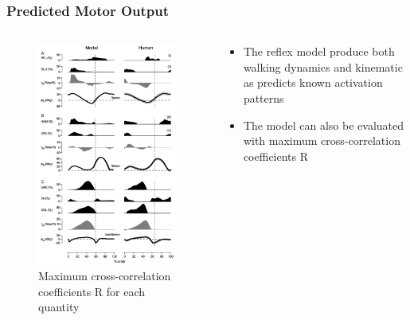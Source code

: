 \documentclass[10pt]{beamer}
\begin{document}
	\begin{frame}
		\frametitle{Predicted Motor Output}
		
		\begin{columns}
			\begin{column}{.5\textwidth}
				\begin{figure}
					\centering
					\includegraphics[height=.75\textheight]{images/graphic_4.pdf}
					\caption{Maximum cross-correlation coefficients R for each quantity}	
				\end{figure}
			\end{column}
			\begin{column}{.5\textwidth}
				\begin{itemize}
					\item The reflex model produce both walking dynamics and kinematic as predicts known activation patterns
					\item The model can also be evaluated with maximum cross-correlation coefficients R
				\end{itemize}
			\end{column}
		\end{columns}
	\end{frame}
	
\end{document}
